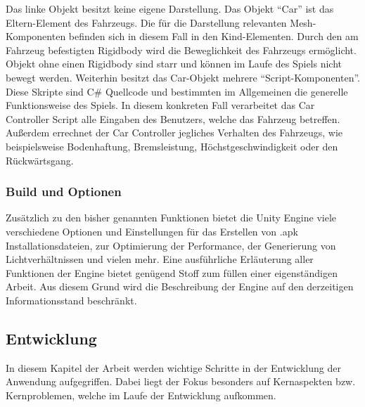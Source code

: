 Das linke Objekt besitzt keine eigene Darstellung. Das Objekt \enquote{Car} ist das Eltern-Element des Fahrzeugs. Die für die Darstellung relevanten Mesh-Komponenten befinden sich in diesem Fall in den Kind-Elementen. Durch den am Fahrzeug befestigten Rigidbody wird die Beweglichkeit des Fahrzeugs ermöglicht. Objekt ohne einen Rigidbody sind starr und können im Laufe des Spiels nicht bewegt werden.
Weiterhin besitzt das Car-Objekt mehrere \enquote{Script-Komponenten}. Diese Skripte sind C\# Quellcode und bestimmten im Allgemeinen die generelle Funktionsweise des Spiels. In diesem konkreten Fall verarbeitet das Car Controller Script alle Eingaben des Benutzers, welche das Fahrzeug betreffen. Außerdem errechnet der Car Controller jegliches Verhalten des Fahrzeugs, wie beispielsweise Bodenhaftung, Bremsleistung, Höchstgeschwindigkeit oder den Rückwärtsgang.

\subsubsection{Build und Optionen}
Zusätzlich zu den bisher genannten Funktionen bietet die Unity Engine viele verschiedene Optionen und Einstellungen für das Erstellen von .apk Installationsdateien, zur Optimierung der Performance, der Generierung von Lichtverhältnissen und vielen mehr. Eine ausführliche Erläuterung aller Funktionen der Engine bietet genügend Stoff zum füllen einer eigenständigen Arbeit. Aus diesem Grund wird die Beschreibung der Engine auf den derzeitigen Informationsstand beschränkt.

\subsection{Entwicklung}
In diesem Kapitel der Arbeit werden wichtige Schritte in der Entwicklung der Anwendung aufgegriffen. Dabei liegt der Fokus besonders auf Kernaspekten bzw. Kernproblemen, welche im Laufe der Entwicklung aufkommen.

